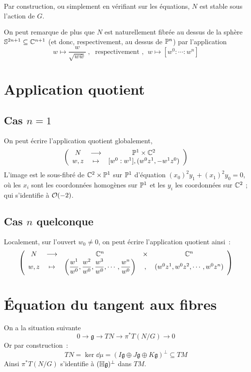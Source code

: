 \documentclass[a4paper,10pt]{article}
\begin{document}
Par construction, ou simplement en vérifiant sur les équations, $N$ est stable sous l'action de $G$.

On peut remarque de plus que $N$ est naturellement fibrée au dessus de la sphère $\mathbb{S}^{2n+1} \subseteq \mathbb{C}^{n+1}$ (et donc, respectivement, au dessus de $\mathbb{P}^{n}$) par l'application
\[
w \mapsto \dfrac{w}{\sqrt{w\bar{w}}} \; , \; \text{ respectivement , } \; w \mapsto [w^0:\cdots :w^n]
\]
\section{Application quotient}
\subsection{Cas $n=1$}
On peut écrire l'application quotient globalement,
\[
\left(
\begin{array}{ccc}
N  & \longrightarrow & \mathbb{P}^1 \times \mathbb{C}^2 \\ 
w , z & \mapsto & [w^0:w^1], (w^0z^1, - w^1z^0)
\end{array} 
\right)
\]
L'image est le sous-fibré de $\mathbb{C}^2 \times \mathbb{P}^1$ sur $\mathbb{P}^1$ d'équation $(x_0)^2 y_1 + (x_1)^2 y_0 = 0$, où les $x_i$ sont les coordonnées homogènes sur $\mathbb{P}^1$ et les $y_i$ les coordonnées sur $\mathbb{C}^2$ ; qui s'identifie à $\mathcal{O}(-2)$.

\subsection{Cas $n$ quelconque}
Localement, sur l'ouvert $w_0 \neq 0$, on peut écrire l'application quotient ainsi~:
\[
\left(
\begin{array}{ccccc}
N  & \longrightarrow & \mathbb{C}^n & \times & \mathbb{C}^n \\ 
w , z & \mapsto & \left(\dfrac{w^1}{w^0}, \dfrac{w^2}{w^0} , \dfrac{w^3}{w^0} , \cdots , \dfrac{w^n}{w^0} \right)&,&(w^0z^1 , w^0z^2 , \cdots , w^0z^n )
\end{array} 
\right)
\]

\section{Équation du tangent aux fibres}
On a la situation suivante
\[
0 \rightarrow \mathfrak{g} \rightarrow TN \rightarrow \pi^*T(N/G) \rightarrow 0
\]
Or par construction~:
\[
TN = \ker \dd \mu = (I\mathfrak{g} \oplus J\mathfrak{g} \oplus K\mathfrak{g})^\bot \subseteq  TM
\]
Ainsi $ \pi^*T(N/G)$ s'identifie à $(\mathbb{H} \mathfrak{g})^\bot$ dans $TM$.
\end{document}
